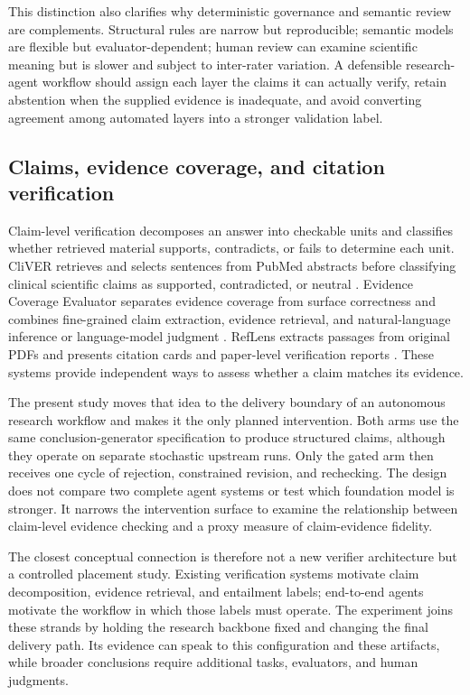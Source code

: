\documentclass[11pt]{article}
\begin{document}
This distinction also clarifies why deterministic governance and semantic review are complements. Structural rules are narrow but reproducible; semantic models are flexible but evaluator-dependent; human review can examine scientific meaning but is slower and subject to inter-rater variation. A defensible research-agent workflow should assign each layer the claims it can actually verify, retain abstention when the supplied evidence is inadequate, and avoid converting agreement among automated layers into a stronger validation label.

\subsection{Claims, evidence coverage, and citation verification}

Claim-level verification decomposes an answer into checkable units and classifies whether retrieved material supports, contradicts, or fails to determine each unit. CliVER retrieves and selects sentences from PubMed abstracts before classifying clinical scientific claims as supported, contradicted, or neutral \cite{cliver}. Evidence Coverage Evaluator separates evidence coverage from surface correctness and combines fine-grained claim extraction, evidence retrieval, and natural-language inference or language-model judgment \cite{ece}. RefLens extracts passages from original PDFs and presents citation cards and paper-level verification reports \cite{reflens}. These systems provide independent ways to assess whether a claim matches its evidence.

The present study moves that idea to the delivery boundary of an autonomous research workflow and makes it the only planned intervention. Both arms use the same conclusion-generator specification to produce structured claims, although they operate on separate stochastic upstream runs. Only the gated arm then receives one cycle of rejection, constrained revision, and rechecking. The design does not compare two complete agent systems or test which foundation model is stronger. It narrows the intervention surface to examine the relationship between claim-level evidence checking and a proxy measure of claim-evidence fidelity.

The closest conceptual connection is therefore not a new verifier architecture but a controlled placement study. Existing verification systems motivate claim decomposition, evidence retrieval, and entailment labels; end-to-end agents motivate the workflow in which those labels must operate. The experiment joins these strands by holding the research backbone fixed and changing the final delivery path. Its evidence can speak to this configuration and these artifacts, while broader conclusions require additional tasks, evaluators, and human judgments.
\end{document}
